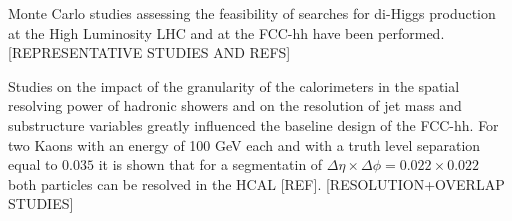 Monte Carlo studies assessing the feasibility of searches for di-Higgs production at the High Luminosity LHC and at the FCC-hh have been performed. [REPRESENTATIVE STUDIES AND REFS]

Studies on the impact of the granularity of the calorimeters in the spatial resolving power of hadronic showers and on the resolution of jet mass and substructure variables greatly influenced the baseline design of the FCC-hh. For two Kaons with an energy of 100 GeV each and with a truth level separation equal to $0.035$ it is shown that for a segmentatin of $\Delta\eta\times\Delta\phi=0.022\times0.022$ both particles can be resolved in the HCAL [REF]. [RESOLUTION+OVERLAP STUDIES] 



